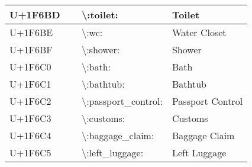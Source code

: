 \begin{table}[h]
\begin{tabulary}{\linewidth}{|L|L|L|L|}
\hline
U+1F6BD & 🚽 & {\textbackslash}:toilet: & Toilet \\
\hline
U+1F6BE & 🚾 & {\textbackslash}:wc: & Water Closet \\
\hline
U+1F6BF & 🚿 & {\textbackslash}:shower: & Shower \\
\hline
U+1F6C0 & 🛀 & {\textbackslash}:bath: & Bath \\
\hline
U+1F6C1 & 🛁 & {\textbackslash}:bathtub: & Bathtub \\
\hline
U+1F6C2 & 🛂 & {\textbackslash}:passport\_control: & Passport Control \\
\hline
U+1F6C3 & 🛃 & {\textbackslash}:customs: & Customs \\
\hline
U+1F6C4 & 🛄 & {\textbackslash}:baggage\_claim: & Baggage Claim \\
\hline
U+1F6C5 & 🛅 & {\textbackslash}:left\_luggage: & Left Luggage \\
\hline
\end{tabulary}

\end{table}